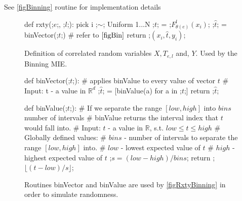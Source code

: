 \documentclass[dissertation.tex]{subfiles}
\begin{document}
See \autoref{figBinning} routine  for implementation
details

\begin{figure}[H]
    \begin{pythonfigure}
      def rxty(;$e$;, ;$l$;):
        pick i ;$\sim$; Uniform {1...N}
        ;$t$; = ;$F_{\theta(e)}^l(x_i)$;
        ;$\hat{t}$; = binVector(;$t$;) # refer to $\autoref{figBin}$
        return ;$(x_i, \hat{t}, y_i)$;
    \end{pythonfigure}
    \caption{
      Definition of correlated random variables $X, T_{e,l}$ and, $Y$. Used by
      the Binning MIE.
    }
    \label{figRxtyBinning}
\end{figure}

\begin{figure}[H]
    \begin{pythonfigure}
      def binVector(;$t$;): 
        # applies binValue to every value of vector $t$
        # Input: t - a value in $\mathbb{R}^d$
        ;$\hat{t}$; = [binValue(a) for a in ;$t$;]
        return ;$\hat{t}$;

      def binValue(;$t$;):
        # If we separate the range $[low, high]$ into $bins$ number of intervals 
        # binValue returns the interval index that $t$ would fall into.
        # Input: $t$ - a value in $\mathbb{R}$, s.t. $low\leq{t}\leq{high}$
        # Globally defined values:
        # $bins$  - number of intervals to separate the range $[low, high]$ into.
        # $low$   - lowest  expected value of $t$
        # $high$  - highest expected value of $t$
        ;$s = (low - high) / bins$;
        return ;$\lfloor{(t - low)/s}\rfloor$;
    \end{pythonfigure}
    \caption{
      Routines binVector and binValue are used by \autoref{figRxtyBinning}
      in order to simulate randomness.
    }
    \label{figBin}
\end{figure}

\newpage
\end{document}
